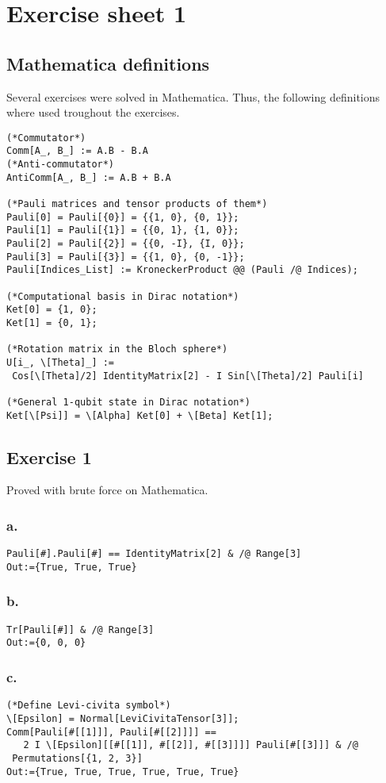 \section{Exercise sheet 1}
\subsection*{Mathematica definitions}
Several exercises were solved in Mathematica. Thus, the following definitions 
where used troughout the exercises.
\begin{verbatim}
(*Commutator*)
Comm[A_, B_] := A.B - B.A
(*Anti-commutator*)
AntiComm[A_, B_] := A.B + B.A

(*Pauli matrices and tensor products of them*)
Pauli[0] = Pauli[{0}] = {{1, 0}, {0, 1}};
Pauli[1] = Pauli[{1}] = {{0, 1}, {1, 0}};
Pauli[2] = Pauli[{2}] = {{0, -I}, {I, 0}};
Pauli[3] = Pauli[{3}] = {{1, 0}, {0, -1}};
Pauli[Indices_List] := KroneckerProduct @@ (Pauli /@ Indices);

(*Computational basis in Dirac notation*)
Ket[0] = {1, 0};
Ket[1] = {0, 1};

(*Rotation matrix in the Bloch sphere*)
U[i_, \[Theta]_] := 
 Cos[\[Theta]/2] IdentityMatrix[2] - I Sin[\[Theta]/2] Pauli[i]

(*General 1-qubit state in Dirac notation*)
Ket[\[Psi]] = \[Alpha] Ket[0] + \[Beta] Ket[1];
\end{verbatim}

\subsection{Exercise 1}\noindent 
Proved with brute force on Mathematica.
\subsubsection{a.}
\begin{verbatim}
Pauli[#].Pauli[#] == IdentityMatrix[2] & /@ Range[3]
Out:={True, True, True}
\end{verbatim}

\subsubsection{b.}
\begin{verbatim}
Tr[Pauli[#]] & /@ Range[3]
Out:={0, 0, 0}
\end{verbatim}

\subsubsection{c.}
\begin{verbatim}
(*Define Levi-civita symbol*)
\[Epsilon] = Normal[LeviCivitaTensor[3]];
Comm[Pauli[#[[1]]], Pauli[#[[2]]]] == 
   2 I \[Epsilon][[#[[1]], #[[2]], #[[3]]]] Pauli[#[[3]]] & /@ 
 Permutations[{1, 2, 3}]
Out:={True, True, True, True, True, True}
\end{verbatim}

